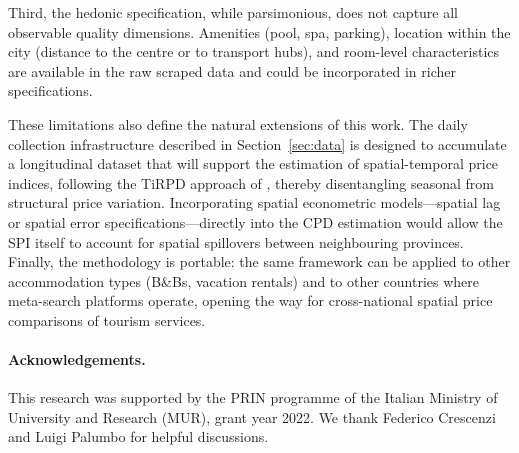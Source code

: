 \documentclass[12pt,a4paper]{article}
\begin{document}
Third, the hedonic specification, while parsimonious, does not capture all observable quality dimensions. Amenities (pool, spa, parking), location within the city (distance to the centre or to transport hubs), and room-level characteristics are available in the raw scraped data and could be incorporated in richer specifications.

These limitations also define the natural extensions of this work. The daily collection infrastructure described in Section~\ref{sec:data} is designed to accumulate a longitudinal dataset that will support the estimation of spatial-temporal price indices, following the TiRPD approach of \citet{laureti2024food}, thereby disentangling seasonal from structural price variation. Incorporating spatial econometric models---spatial lag or spatial error specifications---directly into the CPD estimation would allow the SPI itself to account for spatial spillovers between neighbouring provinces. Finally, the methodology is portable: the same framework can be applied to other accommodation types (B\&Bs, vacation rentals) and to other countries where meta-search platforms operate, opening the way for cross-national spatial price comparisons of tourism services.

\paragraph{Acknowledgements.}
This research was supported by the PRIN programme of the Italian Ministry of University and Research (MUR), grant year 2022. We thank Federico Crescenzi and Luigi Palumbo for helpful discussions.
\end{document}
